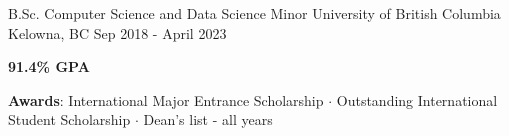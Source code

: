

\begin{cventries}


  \cventry
    {B.Sc. Computer Science and Data Science Minor} %
    {University of British Columbia} %
    {Kelowna, BC} %
    {Sep 2018 - April 2023} %
    {
      \begin{cvitems} %
        \item {\textbf{91.4\% GPA}}
        \item {\textbf{Awards}: International Major Entrance Scholarship $\cdot$ Outstanding International Student Scholarship $\cdot$ Dean's list - all years}
      \end{cvitems}
    }

\end{cventries}



